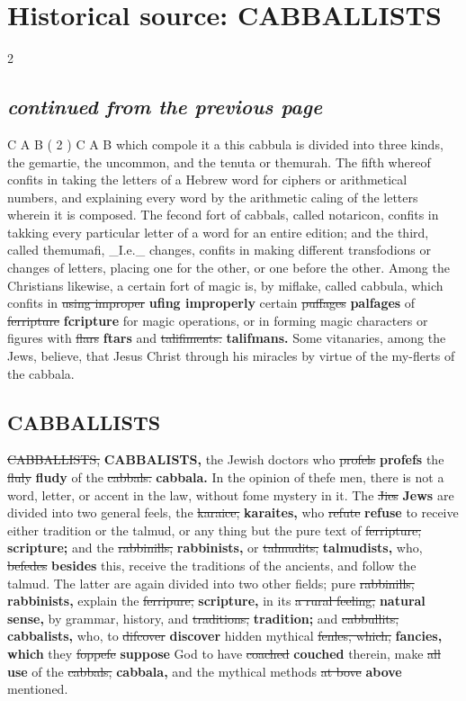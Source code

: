 \documentclass[10pt]{article}
\begin{document}
\section*{Historical source: CABBALLISTS}
\begin{multicols}{2}
\subsection*{\textit{continued from the previous page}}
C A B ( 2 ) C A B which compole it a this cabbula is divided into three kinds, the gemartie, the uncommon, and the tenuta or themurah. The fifth whereof confits in taking the letters of a Hebrew word for ciphers or arithmetical numbers, and explaining every word by the arithmetic caling of the letters wherein it is composed. The fecond fort of cabbals, called notaricon, confits in takking every particular letter of a word for an entire edition; and the third, called themumafi, \_I.e.\_ changes, confits in making different transfodions or changes of letters, placing one for the other, or one before the other. Among the Christians likewise, a certain fort of magic is, by miflake, called cabbula, which confits in \sout{using improper} \textbf{ufing improperly} certain \sout{puffages} \textbf{palfages} of \sout{ferripture} \textbf{fcripture} for magic operations, or in forming magic characters or figures with \sout{flars} \textbf{ftars} and \sout{talifiments.} \textbf{talifmans.} Some vitanaries, among the Jews, believe, that Jesus Christ through his miracles by virtue of the my-flerts of the cabbala.

\subsection*{CABBALLISTS}
\sout{CABBALLISTS,} \textbf{CABBALISTS,} the Jewish doctors who \sout{profels} \textbf{profefs} the \sout{fluly} \textbf{fludy} of the \sout{cabbals.} \textbf{cabbala.} In the opinion of thefe men, there is not a word, letter, or accent in the law, without fome mystery in it. The \sout{Jies} \textbf{Jews} are divided into two general feels, the \sout{karaice,} \textbf{karaites,} who \sout{refute} \textbf{refuse} to receive either tradition or the talmud, or any thing but the pure text of \sout{ferripture;} \textbf{scripture;} and the \sout{rabbinills,} \textbf{rabbinists,} or \sout{talmudits,} \textbf{talmudists,} who, \sout{befedes} \textbf{besides} this, receive the traditions of the ancients, and follow the talmud. The latter are again divided into two other fields; pure \sout{rabbinills,} \textbf{rabbinists,} explain the \sout{ferripure,} \textbf{scripture,} in its \sout{a rural feeling,} \textbf{natural sense,} by grammar, history, and \sout{traditions,} \textbf{tradition;} and \sout{cabbullits,} \textbf{cabbalists,} who, to \sout{difcover} \textbf{discover} hidden mythical \sout{fenles, which,} \textbf{fancies, which} they \sout{foppefe} \textbf{suppose} God to have \sout{coached} \textbf{couched} therein, make \sout{all} \textbf{use} of the \sout{cabbals,} \textbf{cabbala,} and the mythical methods \sout{at bove} \textbf{above} mentioned.


\end{multicols}
\end{document}
